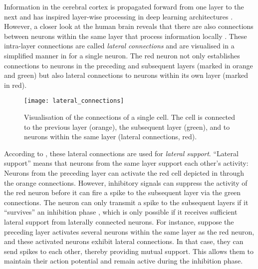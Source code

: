 Information in the cerebral cortex is propagated forward from one layer to the next and has inspired layer-wise processing in deep learning architectures .
However, a closer look at the human brain reveals that there are also connections between neurons within the same layer that process information locally .
These intra-layer connections are called \emph{lateral connections}  and are visualised in a simplified manner in  for a single neuron.
The red neuron not only establishes connections to neurons in the preceding and subsequent layers (marked in orange and green) but also lateral connections to neurons within its own layer (marked in red).

\begin{figure}[h]
    \centering
    \texttt{[image: lateral\_connections]}
    \caption[Lateral connections of a cell]{Visualisation of the connections of a single cell. The cell is connected to the previous layer (orange), the subsequent layer (green), and to neurons within the same layer (lateral connections, red).}
\end{figure}

According to , these lateral connections are used for \emph{lateral support}. ``Lateral support'' means that neurons from the same layer support each other's activity:
Neurons from the preceding layer can activate the red cell depicted in  through the orange connections.
However, inhibitory signals can suppress the activity  of the red neuron before it can fire a spike to the subsequent layer via the green connections. The neuron can only transmit a spike to the subsequent layers if it ``survives'' an inhibition phase , which is only possible if it receives sufficient lateral support  from laterally connected neurons.
For instance, suppose the preceding layer activates several neurons within the same layer as the red neuron, and these activated neurons exhibit lateral connections. In that case, they can send spikes to each other, thereby providing mutual support. This allows them to maintain their action potential and remain active during the inhibition phase.

